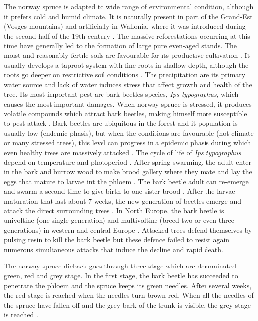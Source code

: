 \documentclass[3p,procedia]{elsarticle}
\begin{document}
The norway spruce is adapted to wide range of environmental condition, although it prefers cold and humid climate.
It is naturally present in part of the Grand-Est (Vosges mountains) and artificially in Wallonia, where it was introduced during the second half of the 19th century \citep{Noirfalise_1975}.
The massive reforestations occurring at this time have generally led to the formation of large pure even-aged stands.
The moist and reasonably fertile soils are favourable for its productive cultivation \citep{horgan_guide_2003}.
It usually develops a taproot system with fine roots in shallow depth, although the roots go deeper on restrictive soil conditions \citep{puhe_roots_2003}.   
The precipitation are its primary water source \citep{tjoelker_outline_2007} and lack of water induces stress that affect growth and health of the tree. 
Its most important pest are bark beetles species, \textit{Ips typographus}, which causes the most important damages.
When norway spruce is stressed, it produces volatile compounds which attract bark beetles, making himself more susceptible to pest attack \citep{netherer_waterlimiting_2015,netherer_interactions_2021}.
Bark beetles are ubiquitous in the forest and it population is usually low (endemic phasis), but when the conditions are favourable (hot climate or many stressed trees), this level can progress in a epidemic phasis during which even healthy trees are massively attacked \citep{kautz_individual_2014}.
The cycle of life of \textit{Ips typographus} depend on temperature and photoperiod \citep{baier_phenipscomprehensive_2007,annila_influence_1969}.
After spring swarming, the adult enter in the bark and burrow wood to make brood gallery where they mate and lay the eggs that mature to larvae int the phloem \citep{hlasny_bark_2021}.
The bark beetle adult can re-emerge and swarm a second time to give birth to one sister brood \citep{zolubas_1995}.
After the larvae maturation that last about 7 weeks, the new generation of beetles emerge and attack the direct surrounding trees \citep{zolubas_1995}.
In North Europe, the bark beetle is univoltine (one single generation) and multivoltine (breed two or even three generations) in western and central Europe \citep{annila_influence_1969}.
Attacked trees defend themselves by pulsing resin to kill the bark beetle but these defence failed to resist again numerous simultaneous attacks that induce the decline and rapid death.

The norway spruce dieback goes through three stage which are denominated green, red and grey stage.
In the first stage, the bark beetle has succeeded to penetrate the phloem and the spruce keeps its green needles. 
After several weeks, the red stage is reached when the needles turn brown-red. 
When all the needles of the spruce have fallen off and the grey bark of the trunk is visible, the grey stage is reached \citep{abdullah_european_2018}.
\end{document}
